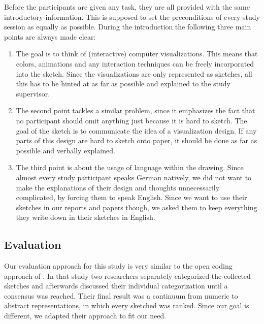 Before the participants are given any task, they are all provided with the same introductory information. This is supposed to set the preconditions of every study session as equally as possible. During the introduction the following three main points are always made clear:
\begin{enumerate}
	\item The goal is to think of (interactive) computer visualizations. This means that colors, animations and any interaction techniques can be freely incorporated into the sketch. Since the visualizations are only represented as sketches, all this has to be hinted at as far as possible and explained to the study supervisor.
	
	\item The second point tackles a similar problem, since it emphasizes the fact that no participant should omit anything just because it is hard to sketch. The goal of the sketch is to communicate the idea of a visualization design. If any parts of this design are hard to sketch onto paper, it should be done as far as possible and verbally explained.
	
	\item The third point is about the usage of language within the drawing. Since almost every study participant speaks German natively, we did not want to make the explanations of their design and thoughts unnecessarily complicated, by forcing them to speak English. Since we want to use their sketches in our reports and papers though, we asked them to keep everything they write down in their sketches in English. 
	
\end{enumerate} 

\subsection*{Evaluation}
Our evaluation approach for this study is very similar to the open coding approach of \citet{walny2015exploratory}. In that study two researchers separately categorized the collected sketches and afterwards discussed their individual categorization until a consensus was reached. Their final result was a continuum from numeric to abstract representations, in which every sketched was ranked. Since our goal is different, we adapted their approach to fit our need. \par \medskip

